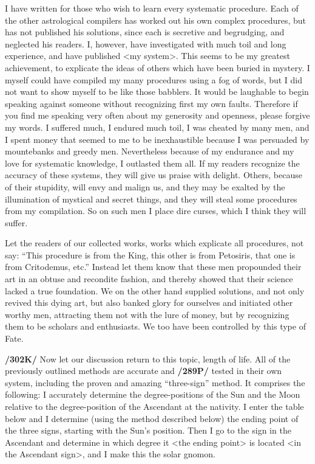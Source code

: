 I have written for those who wish to learn every systematic procedure. Each of the other astrological compilers has worked out his own complex procedures, but has not published his solutions, since each is
secretive and begrudging, and neglected his readers. I, however, have investigated with much toil and long experience, and have published <my system>. This seems to be my greatest achievement, to explicate the ideas of others which have been buried in mystery. I myself could have compiled my many procedures using a fog of words, but I did not want to show myself to be like those babblers. It would be laughable to begin speaking against someone without recognizing first my own faults. Therefore if you find me speaking very often about my generosity and openness, please forgive my words. I suffered much, I
endured much toil, I was cheated by many men, and I spent money that seemed to me to be inexhaustible because I was persuaded by mountebanks and greedy men. Nevertheless because of my endurance and my love for systematic knowledge, I outlasted them all. If my readers recognize the accuracy of these systems, they will give us praise with delight. Others, because of their stupidity, will envy and malign us, and they may be exalted by the illumination of mystical and secret things, and they will steal some procedures from my compilation. So on such men I place dire curses, which I think they will suffer.

Let the readers of our collected works, works which explicate all procedures, not say: “This procedure is from the King, this other is from Petosiris, that one is from Critodemus, etc.” Instead let them know
that these men propounded their art in an obtuse and recondite fashion, and thereby showed that their science lacked a true foundation. We on the other hand supplied solutions, and not only revived this dying art, but also banked glory for ourselves and initiated other worthy men, attracting them not with the lure of money, but by recognizing them to be scholars and enthusiasts. We too have been controlled by this type of Fate.

\textbf{/302K/} Now let our discussion return to this topic, length of life. All of the previously outlined methods are accurate and \textbf{/289P/} tested in their own system, including the proven and amazing “three-sign” method. It comprises the following: I accurately determine the degree-positions of the Sun and the Moon relative to the degree-position of the Ascendant at the nativity. I enter the table below and I determine (using the method described below) the ending point of the three signs, starting with the Sun’s position. Then I go to the sign in the Ascendant and determine in which degree it <the ending point> is located <in the Ascendant sign>, and I make this the solar gnomon.

